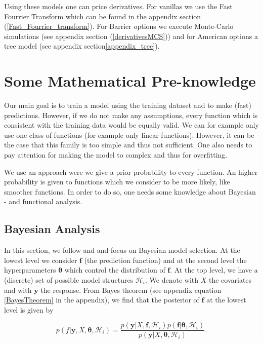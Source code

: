 \documentclass[12pt,a4paper,oneside]{book}
\begin{document}
Using these models one can price derivatives. For vanillas we use the Fast Fourrier Transform which can be found in the appendix section (\ref{Fast_Fourrier_transform}). For Barrier options we execute Monte-Carlo simulations (see appendix section (\ref{derivativesMCS})) and for American options a tree model (see appendix section\ref{appendix_tree}).



\chapter{Some Mathematical Pre-knowledge} 

Our main goal is to train a model using the training dataset and to make (fast) predictions. However, if we do not make any assumptions, every function which is consistent with the training data would be equally valid. We can for example only use one class of functions (for example only linear functions). However, it can be the case that this family is too simple and thus not sufficient. One also needs to pay attention for making the model to complex and thus for overfitting. 

We use an approach were we give a prior probability to every function. An higher probability is given to functions which we consider to be more likely, like smoother functions. In order to do so, one needs some knowledge about Bayesian - and functional analysis. 

\section{Bayesian Analysis}

In this section, we follow \cite{GPRbook} and \cite{camillagpr} and focus on Bayesian model selection. At the lowest level we consider $\bm{f}$ (the prediction function) and at the second level the hyperparameters $\bm{\theta}$ which control the distribution of $\bm{f}$. At the top level, we have a (discrete) set of possible model structures $\mathcal{H}_i$. We denote with $X$ the covariates and with $\bm{y}$ the response. From Bayes theorem (see appendix equation \ref{BayesTheorem} in the appendix), we find that the posterior of $\bm{f}$ at the lowest level is given by

\begin{equation}\label{Bayesian_analysis1}
p(f|\bm{y},X,\bm{\theta},\mathcal{H}_i) = \dfrac{p(\bm{y}|X,\bm{f},\mathcal{H}_i)p(\bm{f}|\bm{\theta},\mathcal{H}_i)}{p(\bm{y}|X,\bm{\theta},\mathcal{H}_i)}.
\end{equation}
\end{document}
